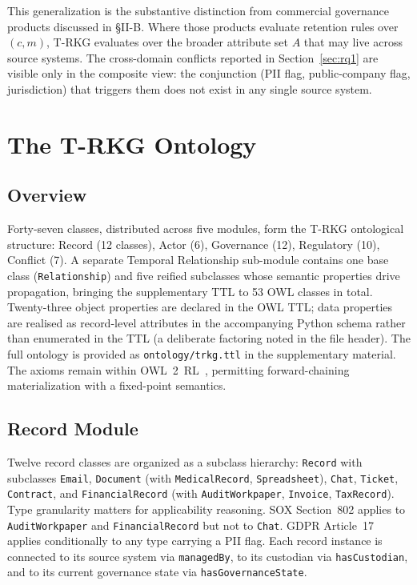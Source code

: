 \documentclass{ieeeaccess}
\begin{document}
This generalization is the substantive distinction from commercial governance products discussed in §II-B. Where those products evaluate retention rules over $(c, m)$, T-RKG evaluates over the broader attribute set $A$ that may live across source systems. The cross-domain conflicts reported in Section~\ref{sec:rq1} are visible only in the composite view: the conjunction (PII flag, public-company flag, jurisdiction) that triggers them does not exist in any single source system.

\section{The T-RKG Ontology}

\subsection{Overview}

Forty-seven classes, distributed across five modules, form the T-RKG ontological structure: Record (12 classes), Actor (6), Governance (12), Regulatory (10), Conflict (7). A separate Temporal Relationship sub-module contains one base class (\texttt{Relationship}) and five reified subclasses whose semantic properties drive propagation, bringing the supplementary TTL to 53 OWL classes in total. Twenty-three object properties are declared in the OWL TTL; data properties are realised as record-level attributes in the accompanying Python schema rather than enumerated in the TTL (a deliberate factoring noted in the file header). The full ontology is provided as \texttt{ontology/trkg.ttl} in the supplementary material. The axioms remain within OWL~2~RL~\cite{owl2}, permitting forward-chaining materialization with a fixed-point semantics.

\subsection{Record Module}

Twelve record classes are organized as a subclass hierarchy: \texttt{Record} with subclasses \texttt{Email}, \texttt{Document} (with \texttt{MedicalRecord}, \texttt{Spreadsheet}), \texttt{Chat}, \texttt{Ticket}, \texttt{Contract}, and \texttt{FinancialRecord} (with \texttt{AuditWorkpaper}, \texttt{Invoice}, \texttt{TaxRecord}). Type granularity matters for applicability reasoning. SOX Section~802 applies to \texttt{AuditWorkpaper} and \texttt{FinancialRecord} but not to \texttt{Chat}. GDPR Article~17 applies conditionally to any type carrying a PII flag. Each record instance is connected to its source system via \texttt{managedBy}, to its custodian via \texttt{hasCustodian}, and to its current governance state via \texttt{hasGovernanceState}.
\end{document}
